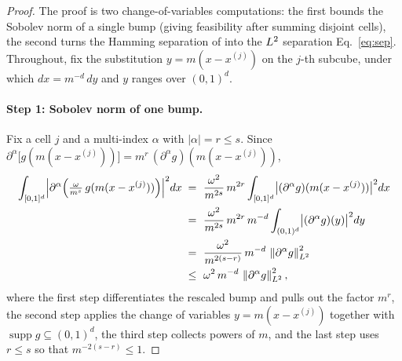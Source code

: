 \begin{proof}
The proof is two change-of-variables computations: the first bounds the
Sobolev norm of a single bump (giving feasibility after summing disjoint
cells), the second turns the Hamming separation of  into the
$L^{2}$ separation Eq.~\eqref{eq:sep}. Throughout, fix the substitution
$y=m(x-x^{(j)})$ on the $j$-th subcube, under which $dx = m^{-d}\,dy$ and $y$
ranges over $(0,1)^d$.

\paragraph{Step 1: Sobolev norm of one bump.}
Fix a cell $j$ and a multi-index $\alpha$ with $|\alpha|=r\le s$. Since
$\partial^{\alpha}\bigl[g(m(x-x^{(j)}))\bigr] = m^{r}\,(\partial^{\alpha}g)(m(x-x^{(j)}))$,
\begin{align*}
\int_{[0,1]^d}\Bigl|\partial^{\alpha}\Bigl(\tfrac{\omega}{m^{s}}\,g(m(x-x^{(j)}))\Bigr)\Bigr|^2 dx
\;=\; & ~ \frac{\omega^2}{m^{2s}}\,m^{2r}\int_{[0,1]^d}\bigl|(\partial^{\alpha}g)(m(x-x^{(j)}))\bigr|^2 dx \\
\;=\; & ~ \frac{\omega^2}{m^{2s}}\,m^{2r}\,m^{-d}\int_{(0,1)^d}\bigl|(\partial^{\alpha}g)(y)\bigr|^2 dy \\
\;=\; & ~ \frac{\omega^2}{m^{2(s-r)}}\,m^{-d}\,\left\| \partial^{\alpha}g \right\|_{L^{2}}^2 \\
\;\le\; & ~ \omega^2\,m^{-d}\,\left\| \partial^{\alpha}g \right\|_{L^{2}}^2,
\end{align*}
where the first step differentiates the rescaled bump and pulls out the factor
$m^{r}$, the second step applies the change of variables $y=m(x-x^{(j)})$
together with $\operatorname{supp} g\subseteq(0,1)^d$, the third step collects
powers of $m$, and the last step uses $r\le s$ so that $m^{-2(s-r)}\le 1$.


\end{proof}
